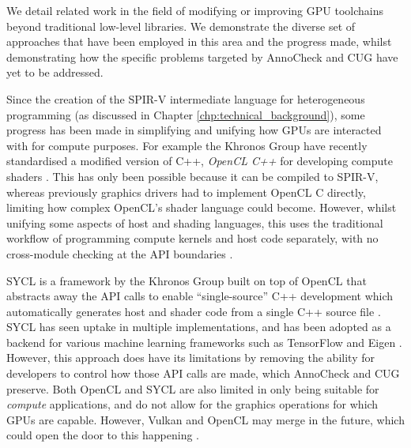 \documentclass[a4paper,12pt,twoside,openright]{report}
\begin{document}
\label{chp:related_work}

We detail related work in the field of modifying or improving GPU toolchains
beyond traditional low-level libraries. We demonstrate the diverse set of
approaches that have been employed in this area and the progress made, whilst
demonstrating how the specific problems targeted by AnnoCheck and CUG have yet
to be addressed.

Since the creation of the SPIR-V intermediate language for heterogeneous
programming (as discussed in Chapter \ref{chp:technical_background}), some
progress has been made in simplifying and unifying how GPUs are interacted with
for compute purposes. For example the Khronos Group have recently standardised
a modified version of C++, \textit{OpenCL C++} for developing compute shaders
\cite{OpenCL22Release} \cite{OpenCLCPPWhitePaper} \cite{OpenCL}. This has only
been possible because it can be compiled to SPIR-V, whereas previously graphics
drivers had to implement OpenCL C directly, limiting how complex OpenCL's
shader language could become. However, whilst unifying some aspects of host and
shading languages, this uses the traditional workflow of programming compute
kernels and host code separately, with no cross-module checking at the API
boundaries \cite{OpenCL22Release}.

SYCL is a framework by the Khronos Group built on top of OpenCL that abstracts
away the API calls to enable ``single-source'' C++ development which
automatically generates host and shader code from a single C++ source file
\cite{OpenCL22Release} \cite{SYCL}. SYCL has seen uptake in multiple
implementations, and has been adopted as a backend for various machine learning
frameworks such as TensorFlow and Eigen \cite{ComputeCPP} \cite{triSYCL}
\cite{SYCLTensorFlow} \cite{SYCLEigen}. However, this approach does have its
limitations by removing the ability for developers to control how those API
calls are made, which AnnoCheck and CUG preserve. Both OpenCL and SYCL are also
limited in only being suitable for \textit{compute} applications, and do not
allow for the graphics operations for which GPUs are capable. However, Vulkan
and OpenCL may merge in the future, which could open the door to this happening
\cite{VulkanOpenCLMerge}.
\end{document}
